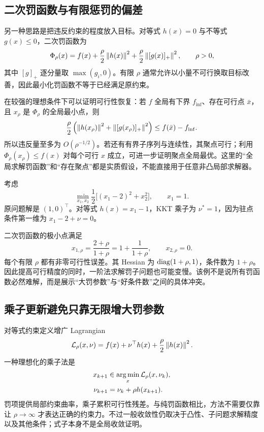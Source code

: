 \subsection{二次罚函数与有限惩罚的偏差}

另一种思路是把违反约束的程度放入目标。对等式 $h(x)=0$ 与不等式 $g(x)\leq0$，二次罚函数为
\begin{equation}
 \Phi_\rho(x)=f(x)+\frac\rho2\left\lVert h(x)\right\rVert^2
                    +\frac\rho2\left\lVert[g(x)]_+\right\rVert^2,
 \qquad\rho>0,
 \label{l2:quadratic-penalty}
\end{equation}
其中 $[g]_+$ 逐分量取 $\max(g_i,0)$。有限 $\rho$ 通常允许以小量不可行换取目标改善，因此最小化罚函数不等于已经满足原约束。

在较强的理想条件下可以证明可行性恢复：若 $f$ 全局有下界 $f_{\inf}$、存在可行点 $\bar x$，且 $x_\rho$ 是 $\Phi_\rho$ 的全局最小点，则
\[
 \frac\rho2\left(\left\lVert h(x_\rho)\right\rVert^2+
                       \left\lVert[g(x_\rho)]_+\right\rVert^2\right)
 \leq f(\bar x)-f_{\inf}.
\]
所以违反量至多为 $O(\rho^{-1/2})$。若还有有界子序列与连续性，其聚点可行；利用 $\Phi_\rho(x_\rho)\leq f(x)$ 对每个可行 $x$ 成立，可进一步证明聚点全局最优。这里的“全局求解罚函数”和“存在聚点”都是实质假设，不能直接用于任意非凸局部求解器。

\begin{example}
\label{l2:ex-penalty-al}
考虑
\[
 \min_{x_1,x_2}\frac12\bigl[(x_1-2)^2+x_2^2\bigr],
 \qquad x_1=1.
\]
原问题解是 $(1,0)^\top$。对等式 $h(x)=x_1-1$，KKT 乘子为 $\nu^*=1$，因为驻点条件第一维为 $x_1-2+\nu=0$。

二次罚函数的极小点满足
\[
 x_{1,\rho}=\frac{2+\rho}{1+\rho}
           =1+\frac1{1+\rho},\qquad x_{2,\rho}=0.
\]
每个有限 $\rho$ 都有非零可行性误差。其 Hessian 为 $\operatorname{diag}(1+\rho,1)$，条件数为 $1+\rho$。因此提高可行精度的同时，一阶法求解罚子问题也可能变慢。该例不是说所有罚函数必然难解，而是展示“大罚参数”与“好条件数”之间的具体冲突。
\end{example}

\subsection{乘子更新避免只靠无限增大罚参数}

对等式约束定义增广 Lagrangian
\begin{equation}
 \mathcal L_\rho(x,\nu)=f(x)+\nu^\top h(x)
                                  +\frac\rho2\left\lVert h(x)\right\rVert^2.
 \label{l2:augmented-lagrangian}
\end{equation}
一种理想化的乘子法是
\begin{align}
 x_{k+1}&\in\operatorname*{arg\,min}_x\mathcal L_\rho(x,\nu_k),\label{l2:al-primal}\\
 \nu_{k+1}&=\nu_k+\rho h(x_{k+1}).\label{l2:al-dual}
\end{align}
罚项提供局部约束曲率，乘子累积可行性残差。与纯罚函数相比，方法不需要仅靠让 $\rho\to\infty$ 才表达正确的约束力。不过一般收敛性仍取决于凸性、子问题求解精度以及其他条件；式子本身不是全局收敛证明。

